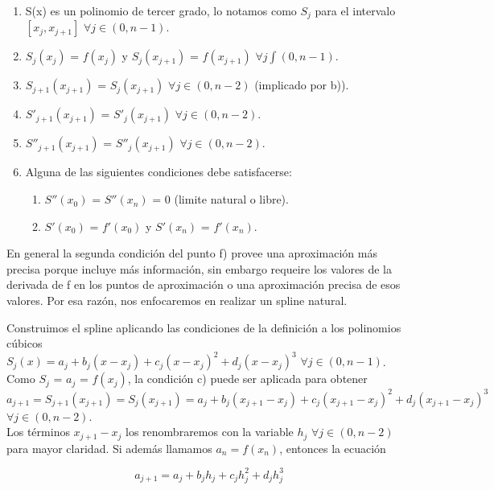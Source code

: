 \begin{enumerate}
\item  S(x) es un polinomio de tercer grado, lo notamos como $S_{j}$ para el intervalo $[x_{j},x_{j+1}]$ $\forall j \in (0, n-1)$.
\item $S_{j}(x_{j})$ = $f(x_{j})$  y $S_{j}(x_{j+1})$ = $f(x_{j+1})$ $\forall j \int (0, n-1)$.
\item $S_{j+1}(x_{j+1})$ = $S_{j}(x_{j+1})$ $\forall j \in (0, n-2)$ (implicado por b)).
\item $S'_{j+1}(x_{j+1})$ = $S'_{j}(x_{j+1})$ $\forall j \in (0, n-2)$.
\item $S''_{j+1}(x_{j+1})$ = $S''_{j}(x_{j+1})$ $\forall j \in (0, n-2)$.
\item Alguna de las siguientes condiciones debe satisfacerse:
  \begin{enumerate}
  \item $S''(x_{0})$ = $S''(x_{n})$ = 0 (limite natural o libre).
  \item $S'(x_{0})$ = $f'(x_{0})$ y $S'(x_{n})$ = $f'(x_{n})$.
  \end{enumerate}
\end{enumerate}

En general la segunda condición del punto f) provee una aproximación más precisa porque incluye más información, sin embargo requeire los valores de la derivada de f en los puntos de aproximación o una aproximación precisa de esos valores. Por esa razón, nos enfocaremos en realizar un spline natural.\\

\newpage

Construimos el spline aplicando las condiciones de la definición a los polinomios cúbicos\\ $S_{j}(x) = a_{j} + b_{j} (x - x_{j}) + c_{j} (x - x_{j})^{2} + d_{j} (x - x_{j})^{3}$ $\forall j \in (0, n-1)$.\\
Como $S_{j}$ = $a_{j}$ = $f(x_{j})$, la condición c) puede ser aplicada para obtener $ a_{j+1} = S_{j+1}(x_{j+1}) = S_{j}(x_{j+1}) = a_{j} + b_{j} (x_{j+1} - x_{j}) + c_{j} (x_{j+1} - x_{j})^{2} + d_{j} (x_{j+1} - x_{j})^{3}$ $\forall j \in (0, n-2)$.\\

Los términos $ x_{j+1} - x_{j} $ los renombraremos con la variable $h_{j}$ $\forall j \in (0, n-2)$ para mayor claridad. Si además llamamos $a_{n} = f(x_{n})$, entonces la ecuación

\begin{equation} \label{eq:ecuacion3.15}
a_{j+1} = a_{j} + b_{j} h_{j} + c_{j} h_{j}^{2} + d_{j} h_{j}^{3} 
\end{equation}


